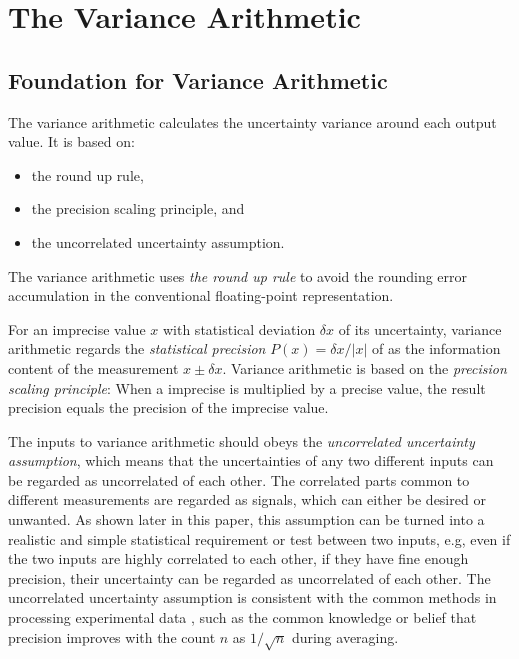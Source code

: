 \documentclass[twoside]{article}
\numberwithin{equation}{section}
\begin{document}
\clearpage
\section{The Variance Arithmetic}
\label{sec: Variance arithmetic}


\subsection{Foundation for Variance Arithmetic}

The variance arithmetic calculates the uncertainty variance around each output value.
It is based on:
\begin{itemize}
\item the round up rule,
\item the precision scaling principle, and
\item the uncorrelated uncertainty assumption.
\end{itemize}  

The variance arithmetic uses \emph{the round up rule} to avoid the rounding error accumulation in the conventional floating-point representation.

For an imprecise value $x$ with statistical deviation $\delta x$ of its uncertainty, variance arithmetic regards the \emph{statistical precision} $P(x) = \delta x/|x|$ of as the information content of the measurement $x \pm \delta x$.
Variance arithmetic is based on the \emph{precision scaling principle}: When a imprecise is multiplied by a precise value, the result precision equals the precision of the imprecise value.

The inputs to variance arithmetic should obeys the \emph{uncorrelated uncertainty assumption}, which means that the uncertainties of any two different inputs can be regarded as uncorrelated of each other. 
The correlated parts common to different measurements are regarded as signals, which can either be desired or unwanted.
As shown later in this paper, this assumption can be turned into a realistic and simple statistical requirement or test between two inputs, e.g, even if the two inputs are highly correlated to each other, if they have fine enough precision, their uncertainty can be regarded as uncorrelated of each other.
The uncorrelated uncertainty assumption is consistent with the common methods in processing experimental data \cite{Statistical_Methods}\cite{Precisions_Physical_Measurements}, such as the common knowledge or belief that precision improves with the count $n$ as $1 / \sqrt{n}$ during averaging.
\end{document}
